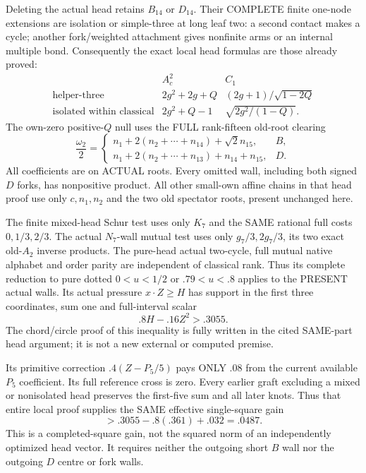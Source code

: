 \documentclass[11pt]{article}
\begin{document}
Deleting the actual head retains \(B_{14}\)
or \(D_{14}\).
Their COMPLETE finite one-node extensions
are isolation or simple-three at long
leaf two: a second contact makes a cycle;
another fork/weighted attachment gives
nonfinite arms or an internal multiple bond.
Consequently the exact local head formulas
are those already proved:
\[
 \begin{array}{c|c|c}
 &A_c^2&C_1\\ \hline
 \text{helper-three}&2g^2+2g+Q&(2g+1)/\sqrt{1-2Q}\\
 \text{isolated within classical}&2g^2+Q-1&
                                    \sqrt{2g^2/(1-Q)} .
 \end{array}
\]
The own-zero positive-\(Q\) null uses the
FULL rank-fifteen old-root clearing
\[
 {\frac{\omega_2}{2}}=
 \begin{cases}
 n_1+2(n_2+\cdots+n_{14})+\sqrt2n_{15},&B,\\
 n_1+2(n_2+\cdots+n_{13})+n_{14}+n_{15},&D .
 \end{cases}
\]
All coefficients are on ACTUAL roots.
Every omitted wall, including both signed
\(D\) forks, has nonpositive product.
All other small-own affine chains in
that head proof use only \(c,n_1,n_2\)
and the two old spectator roots, present
unchanged here.

The finite mixed-head Schur test uses
only \(K_7\) and the SAME rational full
costs \(0,1/3,2/3\).
The actual \(N_7\)-wall mutual test uses
only \(g_7/3,2g_7/3\), its two exact
old-\(A_2\) inverse products.
The pure-head actual two-cycle, full
mutual native alphabet and order parity
are independent of classical rank.
Thus its complete reduction to pure
dotted \(0<u<1/2\) or \(.79<u<.8\)
applies to the PRESENT actual walls.
Its actual pressure \(x\cdot Z\ge H\)
has support in the first three coordinates,
sum one and full-interval scalar
\[
                            .8H-.16Z^2>.3055 .
\]
The chord/circle proof of this inequality
is fully written in the cited SAME-part
head argument; it is not a new external
or computed premise.

Its primitive correction \(.4(Z-P_5/5)\)
pays ONLY \(.08\) from the current available
\(P_5\) coefficient.
Its full reference cross is zero.
Every earlier graft excluding a mixed
or nonisolated head preserves the first-five
sum and all later knots.
Thus that entire local proof supplies the
SAME effective single-square gain
\[
                          >.3055-.8(.361)+.032=.0487 .
\]
This is a completed-square gain, not the
squared norm of an independently optimized
head vector.
It requires neither the outgoing short
\(B\) wall nor the outgoing \(D\) centre
or fork walls.
\end{document}
